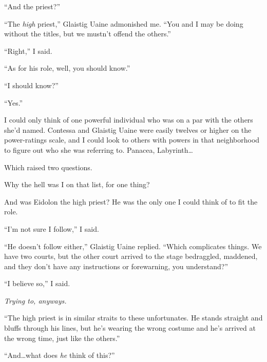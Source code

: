 ``And the priest?''



``The \emph{high} priest,'' Glaistig Uaine admonished me.  ``You and I may be doing without the titles, but we mustn't offend the others.''



``Right,'' I said.



``As for his role, well, you should know.''



``I should know?''



``Yes.''



I could only think of one powerful individual who was on a par with the others she'd named.  Contessa and Glaistig Uaine were easily twelves or higher on the power-ratings scale, and I could look to others with powers in that neighborhood to figure out who she was referring to.  Panacea, Labyrinth\ldots



Which raised two questions.



Why the hell was I on that list, for one thing?



And was Eidolon the high priest?  He was the only one I could think of to fit the role.



``I'm not sure I follow,'' I said.



``He doesn't follow either,'' Glaistig Uaine replied.  ``Which complicates things.  We have two courts, but the other court arrived to the stage bedraggled, maddened, and they don't have any instructions or forewarning, you understand?''



``I believe so,'' I said.



\emph{Trying to, anyways.}



``The high priest is in similar straits to these unfortunates.  He stands straight and bluffs through his lines, but he's wearing the wrong costume and he's arrived at the wrong time, just like the others.''



``And\ldots what does \emph{he} think of this?''



